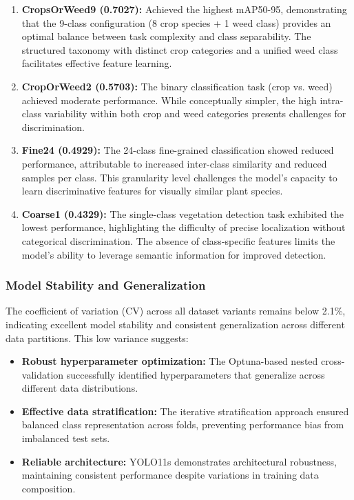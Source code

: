 \begin{enumerate}
    \item \textbf{CropsOrWeed9 (0.7027):} Achieved the highest mAP50-95, demonstrating that the 9-class configuration (8 crop species + 1 weed class) provides an optimal balance between task complexity and class separability. The structured taxonomy with distinct crop categories and a unified weed class facilitates effective feature learning.
    
    \item \textbf{CropOrWeed2 (0.5703):} The binary classification task (crop vs. weed) achieved moderate performance. While conceptually simpler, the high intra-class variability within both crop and weed categories presents challenges for discrimination.
    
    \item \textbf{Fine24 (0.4929):} The 24-class fine-grained classification showed reduced performance, attributable to increased inter-class similarity and reduced samples per class. This granularity level challenges the model's capacity to learn discriminative features for visually similar plant species.
    
    \item \textbf{Coarse1 (0.4329):} The single-class vegetation detection task exhibited the lowest performance, highlighting the difficulty of precise localization without categorical discrimination. The absence of class-specific features limits the model's ability to leverage semantic information for improved detection.
\end{enumerate}

\subsubsection{Model Stability and Generalization}

The coefficient of variation (CV) across all dataset variants remains below 2.1\%, indicating excellent model stability and consistent generalization across different data partitions. This low variance suggests:

\begin{itemize}
    \item \textbf{Robust hyperparameter optimization:} The Optuna-based nested cross-validation successfully identified hyperparameters that generalize across different data distributions.
    
    \item \textbf{Effective data stratification:} The iterative stratification approach ensured balanced class representation across folds, preventing performance bias from imbalanced test sets.
    
    \item \textbf{Reliable architecture:} YOLO11s demonstrates architectural robustness, maintaining consistent performance despite variations in training data composition.
\end{itemize}


